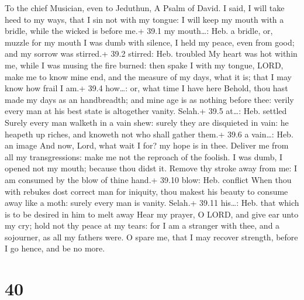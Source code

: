 To the chief Musician, even to Jeduthun, A Psalm of David. 
I said, I will take heed to my ways, that I sin not with my tongue: I
will keep my mouth with a bridle, while the wicked is before me.+ 39.1
my mouth\ldots: Heb. a bridle, or, muzzle for my mouth  I
was dumb with silence, I held my peace, even from good; and my sorrow
was stirred.+ 39.2 stirred: Heb. troubled  My heart was hot
within me, while I was musing the fire burned: then spake I with my
tongue,  LORD, make me to know mine end, and the measure of
my days, what it is; that I may know how frail I am.+ 39.4 how\ldots:
or, what time I have here  Behold, thou hast made my days as
an handbreadth; and mine age is as nothing before thee: verily every man
at his best state is altogether vanity. Selah.+ 39.5 at\ldots: Heb.
settled  Surely every man walketh in a vain shew: surely
they are disquieted in vain: he heapeth up riches, and knoweth not who
shall gather them.+ 39.6 a vain\ldots: Heb. an image  And
now, Lord, what wait I for? my hope is in thee.  Deliver me
from all my transgressions: make me not the reproach of the foolish.
 I was dumb, I opened not my mouth; because thou didst it.
 Remove thy stroke away from me: I am consumed by the blow
of thine hand.+ 39.10 blow: Heb. conflict  When thou with
rebukes dost correct man for iniquity, thou makest his beauty to consume
away like a moth: surely every man is vanity. Selah.+ 39.11 his\ldots:
Heb. that which is to be desired in him to melt away  Hear
my prayer, O LORD, and give ear unto my cry; hold not thy peace at my
tears: for I am a stranger with thee, and a sojourner, as all my fathers
were.  O spare me, that I may recover strength, before I go
hence, and be no more.

\hypertarget{section-39}{%
\section{40}\label{section-39}}

